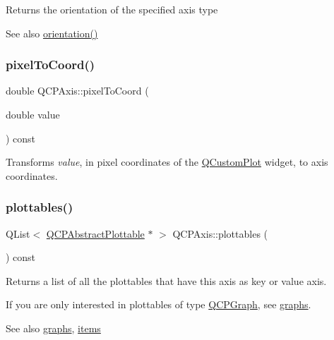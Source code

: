 Returns the orientation of the specified axis type

\begin{DoxySeeAlso}{See also}
\mbox{\hyperlink{class_q_c_p_axis_ab988ef4538e2655bb77bd138189cd42e}{orientation()}} 
\end{DoxySeeAlso}
\mbox{\label{class_q_c_p_axis_a536ef8f624cac59b6b6fdcb495723c57}} 
\subsubsection{\texorpdfstring{pixel\+To\+Coord()}{pixelToCoord()}}
{\footnotesize\ttfamily double Q\+C\+P\+Axis\+::pixel\+To\+Coord (\begin{DoxyParamCaption}\item[{double}]{value }\end{DoxyParamCaption}) const}

Transforms {\itshape value}, in pixel coordinates of the \mbox{\hyperlink{class_q_custom_plot}{Q\+Custom\+Plot}} widget, to axis coordinates. \mbox{\label{class_q_c_p_axis_ac5e0f6f65c75efb5fd32275d6e4ef0d6}} 
\subsubsection{\texorpdfstring{plottables()}{plottables()}}
{\footnotesize\ttfamily Q\+List$<$ \mbox{\hyperlink{class_q_c_p_abstract_plottable}{Q\+C\+P\+Abstract\+Plottable}} $\ast$ $>$ Q\+C\+P\+Axis\+::plottables (\begin{DoxyParamCaption}{ }\end{DoxyParamCaption}) const}

Returns a list of all the plottables that have this axis as key or value axis.

If you are only interested in plottables of type \mbox{\hyperlink{class_q_c_p_graph}{Q\+C\+P\+Graph}}, see \mbox{\hyperlink{class_q_c_p_axis_ad590c0da223697a2727f97a520870fec}{graphs}}.

\begin{DoxySeeAlso}{See also}
\mbox{\hyperlink{class_q_c_p_axis_ad590c0da223697a2727f97a520870fec}{graphs}}, \mbox{\hyperlink{class_q_c_p_axis_a42761bc68e2f3a9f68549d45b73f705b}{items}} 
\end{DoxySeeAlso}
\mbox{\label{class_q_c_p_axis_a0894084e4c16a1736534c4095746f910}} 

